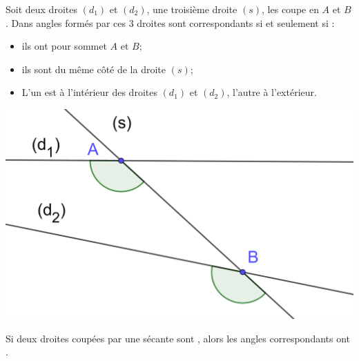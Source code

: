 \documentclass[12pt,a4paper]{article}
\begin{document}
\begin{mydef}
	
	
	Soit deux droites $(d_1)$ et $(d_2)$, une troisième droite $(s)$, les coupe en $A$ et $B$.
	Dans angles formés par ces 3 droites sont correspondants si et seulement si :
	
	\begin{multicols}{2}
		\begin{itemize}
			\item ils ont pour sommet $A$ et $B$;
			\item ils sont du même côté de la droite $(s)$;
			\item L'un est à l'intérieur des droites $(d_1)$ et $(d_2)$, l'autre à l'extérieur.
		\end{itemize}
		
		
		\begin{center}
			\includegraphics[scale=0.12]{corres}
		\end{center}
	\end{multicols}
	
\end{mydef}


\begin{myprop}
	Si deux droites coupées par une sécante sont , alors les angles correspondants ont .
\end{myprop}
\end{document}
